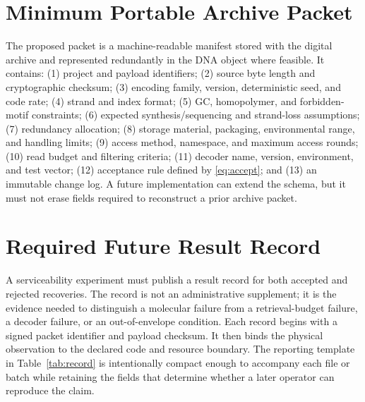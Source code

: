 \documentclass[conference]{IEEEtran}
\begin{document}
\appendices
\section{Minimum Portable Archive Packet}

The proposed packet is a machine-readable manifest stored with the digital archive and represented redundantly in the DNA object where feasible. It contains: (1) project and payload identifiers; (2) source byte length and cryptographic checksum; (3) encoding family, version, deterministic seed, and code rate; (4) strand and index format; (5) GC, homopolymer, and forbidden-motif constraints; (6) expected synthesis/sequencing and strand-loss assumptions; (7) redundancy allocation; (8) storage material, packaging, environmental range, and handling limits; (9) access method, namespace, and maximum access rounds; (10) read budget and filtering criteria; (11) decoder name, version, environment, and test vector; (12) acceptance rule defined by \eqref{eq:accept}; and (13) an immutable change log. A future implementation can extend the schema, but it must not erase fields required to reconstruct a prior archive packet.

\section{Required Future Result Record}

A serviceability experiment must publish a result record for both accepted and rejected recoveries. The record is not an administrative supplement; it is the evidence needed to distinguish a molecular failure from a retrieval-budget failure, a decoder failure, or an out-of-envelope condition. Each record begins with a signed packet identifier and payload checksum. It then binds the physical observation to the declared code and resource boundary. The reporting template in Table~\ref{tab:record} is intentionally compact enough to accompany each file or batch while retaining the fields that determine whether a later operator can reproduce the claim.
\end{document}
